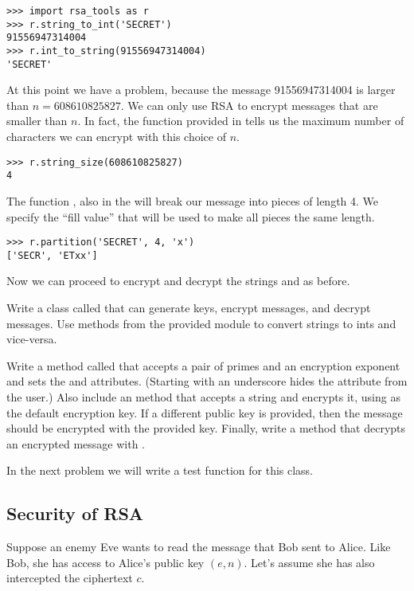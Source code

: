 \begin{lstlisting}
>>> import rsa_tools as r
>>> r.string_to_int('SECRET')
91556947314004
>>> r.int_to_string(91556947314004)
'SECRET'
\end{lstlisting}

At this point we have a problem, because the message 91556947314004 is larger than $n=608610825827$.
We can only use RSA to encrypt messages that are smaller than $n$.
In fact, the function  provided in  tells us the maximum number of characters we can encrypt with this choice of $n$.

\begin{lstlisting}
>>> r.string_size(608610825827)
4
\end{lstlisting}

The function , also in the  will break our message into pieces of length 4.
We specify the ``fill value''  that will be used to make all pieces the same length.

\begin{lstlisting}
>>> r.partition('SECRET', 4, 'x')
['SECR', 'ETxx']
\end{lstlisting}
Now we can proceed to encrypt and decrypt the strings  and  as before.

\begin{problem}
Write a class called  that can generate keys, encrypt messages, and decrypt messages.
Use methods from the provided  module to convert strings to ints and vice-versa.

Write a method called  that accepts a pair of primes and an encryption exponent and sets the  and  attributes.
(Starting  with an underscore hides the attribute from the user.)
Also include an  method that accepts a string and encrypts it, using  as the default encryption key.
If a different public key is provided, then the message should be encrypted with the provided key.
Finally, write a  method that decrypts an encrypted message with .

In the next problem we will write a test function for this class.
\label{prob:rsa1}
\end{problem}

\subsection*{Security of RSA}
Suppose an enemy Eve wants to read the message that Bob sent to Alice.
Like Bob, she has access to Alice's public key $(e, n)$.
Let's assume she has also intercepted the ciphertext $c$.

